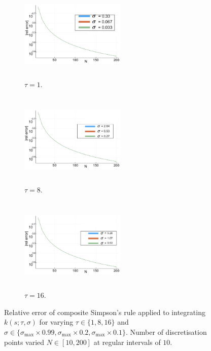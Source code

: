 \begin{figure}[H]
    \centering
    \begin{subfigure}[t]{0.32\textwidth}
        \centering
        \includegraphics[width=5cm,height=4.5cm]{quadt1.png}
        \caption{$\tau=1$.}
        \label{}
    \end{subfigure}
    \hfill
    \begin{subfigure}[t]{0.32\textwidth}
        \centering
        \includegraphics[width=5cm,height=4.5cm]{quadt8.png}
        \caption{$\tau=8$.}
        \label{}
    \end{subfigure}
    \hfill
    \begin{subfigure}[t]{0.32\textwidth}
        \centering
        \includegraphics[width=5cm,height=4.5cm]{quadt16.png}
        \caption{$\tau=16$.}
        \label{}
    \end{subfigure}
    \caption{Relative error of composite Simpson's rule applied to integrating $k(s;\tau,\sigma)$ for varying $\tau\in\{1,8,16\}$ and $\sigma\in\{\sigma_{\max}\times0.99,\sigma_{\max}\times0.2,\sigma_{\max}\times0.1\}$. Number of discretisation points varied $N\in[10,200]$ at regular intervals of $10$.}
    \label{fig:quad}
\end{figure}

